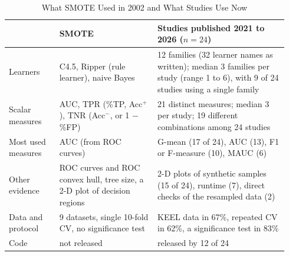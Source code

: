 \begin{table}[t]
  \caption{What SMOTE Used in 2002 and What Studies Use Now}
  \label{tab:empirical-thennow}
  \footnotesize
  \begin{tabular}{@{}p{0.17\linewidth}p{0.33\linewidth}p{0.44\linewidth}@{}}
    \toprule
    & SMOTE~\parencite{chawla2002smote} & Studies published 2021 to 2026 ($n = 24$)\\
    \midrule
    Learners & C4.5, Ripper (rule learner), naive Bayes & 12 families (32 learner names as written); median 3 families per study (range 1 to 6), with 9 of 24 studies using a single family\\
    Scalar measures & AUC, TPR (\%TP, Acc$^+$), TNR (Acc$^-$, or 1 $-$ \%FP) & 21 distinct measures; median 3 per study; 19 different combinations among 24 studies\\
    Most used measures & AUC (from ROC curves) & G-mean (17 of 24), AUC (13), F1 or F-measure (10), MAUC (6)\\
    Other evidence & ROC curves and ROC convex hull, tree size, a 2-D plot of decision regions & 2-D plots of synthetic samples (15 of 24), runtime (7), direct checks of the resampled data (2)\\
    Data and protocol & 9 datasets, single 10-fold CV, no significance test & KEEL data in 67\%, repeated CV in 62\%, a significance test in 83\%\\
    Code & not released & released by 12 of 24\\
    \bottomrule
  \end{tabular}
\end{table}
